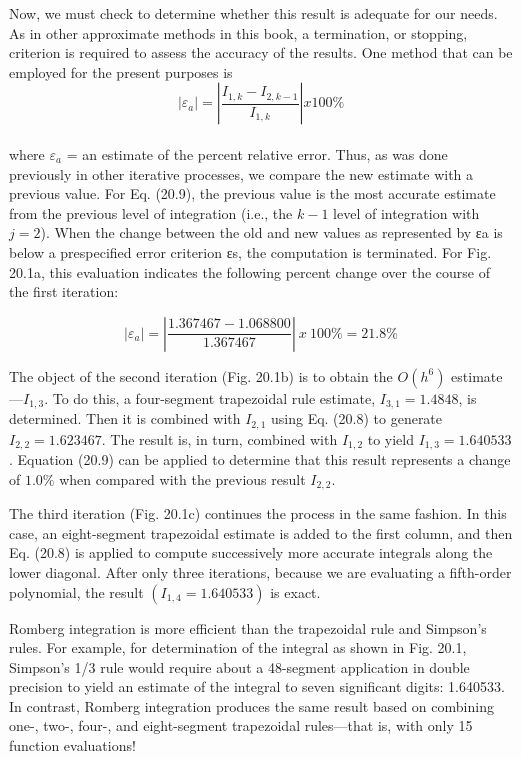 \documentclass[../main.tex]{subfiles}
\begin{document}
Now, we must check to determine whether this result is adequate for our needs. As in
other approximate methods in this book, a termination, or stopping, criterion is required to
assess the accuracy of the results. One method that can be employed for the present purposes is
\begin{equation}
	\tag{20.9}
	|\varepsilon_a|=\left|\dfrac{I_{1,k}-I_{2,k-1}}{I_{1,k}} \right| x100\%
\end{equation}\\
where $\varepsilon_a$ = an estimate of the percent relative error. Thus, as was done previously in other
iterative processes, we compare the new estimate with a previous value. For Eq. (20.9), the
previous value is the most accurate estimate from the previous level of integration (i.e., the
$k − 1$ level of integration with $j = 2$). When the change between the old and new values
as represented by εa is below a prespecified error criterion εs, the computation is terminated. For Fig. 20.1a, this evaluation indicates the following percent change over the
course of the first iteration:

	$$|\varepsilon_a|= \left|\dfrac{1.367467 − 1.068800}{1.367467} \right| \: x \: 100\% = 21.8\%$$
	
The object of the second iteration (Fig. 20.1b) is to obtain the $O(h^6)$ estimate—$I_{1,3}$.
To do this, a four-segment trapezoidal rule estimate, $I_{3,1} = 1.4848$, is determined. Then it
is combined with $I_{2,1}$ using Eq. (20.8) to generate $I_{2,2} = 1.623467$. The result is, in turn,
combined with $I_{1,2}$ to yield $I_{1,3} = 1.640533$. Equation (20.9) can be applied to determine
that this result represents a change of $1.0\%$ when compared with the previous result $I_{2,2}$.

The third iteration (Fig. 20.1c) continues the process in the same fashion. In this case,
an eight-segment trapezoidal estimate is added to the first column, and then Eq. (20.8) is
applied to compute successively more accurate integrals along the lower diagonal. After
only three iterations, because we are evaluating a fifth-order polynomial, the result
$(I_{1,4} = 1.640533)$ is exact.

Romberg integration is more efficient than the trapezoidal rule and Simpson's rules.
For example, for determination of the integral as shown in Fig. 20.1, Simpson's 1/3 rule
would require about a 48-segment application in double precision to yield an estimate of
the integral to seven significant digits: 1.640533. In contrast, Romberg integration produces the same result based on combining one-, two-, four-, and eight-segment trapezoidal
rules—that is, with only 15 function evaluations!
\end{document}
